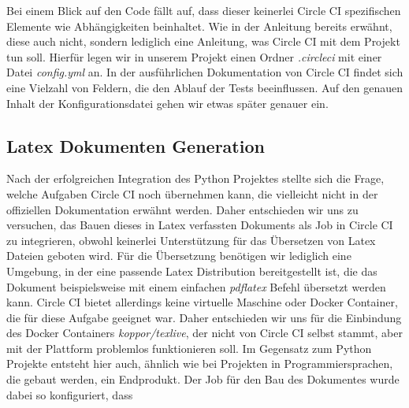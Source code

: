 \documentclass[11pt]{article}
\begin{document}
Bei einem Blick auf den Code fällt auf, dass dieser keinerlei Circle CI spezifischen Elemente wie Abhängigkeiten beinhaltet. Wie in der Anleitung bereits erwähnt, diese auch nicht, sondern lediglich eine Anleitung, was Circle CI mit dem Projekt tun soll. Hierfür legen wir in unserem Projekt einen Ordner
\textit{.circleci} mit einer Datei \textit{config.yml} an. In der ausführlichen Dokumentation von Circle CI
findet sich eine Vielzahl von Feldern, die den Ablauf der Tests beeinflussen. Auf den genauen Inhalt der Konfigurationsdatei gehen wir etwas später genauer ein.

\subsection{Latex Dokumenten Generation}

Nach der erfolgreichen Integration des Python Projektes stellte sich die Frage, welche Aufgaben Circle CI noch übernehmen kann, die vielleicht nicht in der offiziellen Dokumentation erwähnt werden. Daher entschieden wir uns zu versuchen, das Bauen dieses in Latex verfassten Dokuments als Job in Circle CI zu integrieren, obwohl keinerlei Unterstützung für das Übersetzen von Latex Dateien geboten wird. Für die Übersetzung benötigen wir lediglich eine Umgebung, in der eine passende Latex Distribution bereitgestellt ist, die das Dokument beispielsweise mit einem einfachen \textit{pdflatex} Befehl übersetzt werden kann. Circle CI bietet allerdings keine virtuelle Maschine oder Docker Container, die für diese Aufgabe geeignet war. Daher entschieden wir uns für die Einbindung des Docker Containers \textit{koppor/texlive}, der nicht von Circle CI selbst stammt, aber mit der Plattform problemlos funktionieren soll. Im Gegensatz zum Python Projekte entsteht hier auch, ähnlich wie bei Projekten in Programmiersprachen, die gebaut werden, ein Endprodukt. Der Job für den Bau des Dokumentes wurde dabei so konfiguriert, dass 
\end{document}
